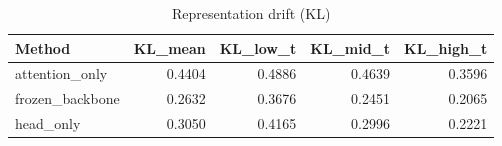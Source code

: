 \begin{table}[htbp]
\centering
\caption{Representation drift (KL)}
\label{tab:repr-drift}
\begin{tabular}{lrrrr}
\toprule
\textbf{Method} & \textbf{KL\_mean} & \textbf{KL\_low\_t} & \textbf{KL\_mid\_t} & \textbf{KL\_high\_t} \\
\midrule
attention\_only & 0.4404 & 0.4886 & 0.4639 & 0.3596 \\
frozen\_backbone & 0.2632 & 0.3676 & 0.2451 & 0.2065 \\
head\_only & 0.3050 & 0.4165 & 0.2996 & 0.2221 \\
\bottomrule
\end{tabular}
\end{table}